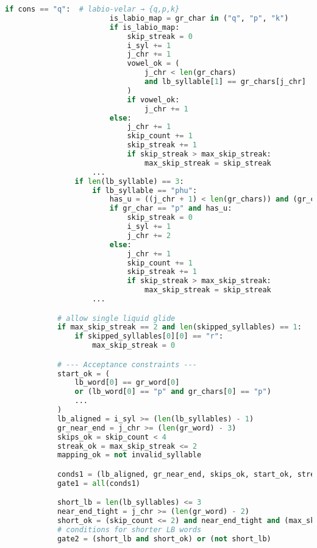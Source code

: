 \begin{lstlisting}[language=Python, caption=Brute-Force matching algorithm, breaklines=true, postbreak=\mbox{\hspace{50pt}\textcolor{red}{$\hookrightarrow$}\space}]
                    if cons == "q":  # labio-velar → {q,p,k}
                        is_labio_map = gr_char in ("q", "p", "k")
                        if is_labio_map:
                            skip_streak = 0
                            i_syl += 1
                            j_chr += 1
                            vowel_ok = (
                                j_chr < len(gr_chars)
                                and lb_syllable[1] == gr_chars[j_chr]
                            )
                            if vowel_ok:
                                j_chr += 1
                        else:
                            j_chr += 1
                            skip_count += 1
                            skip_streak += 1
                            if skip_streak > max_skip_streak:
                                max_skip_streak = skip_streak
                    ...
                if len(lb_syllable) == 3:
                    if lb_syllable == "phu":
                        has_u = ((j_chr + 1) < len(gr_chars)) and (gr_chars[j_chr + 1] == "u")
                        if gr_char == "p" and has_u:
                            skip_streak = 0
                            i_syl += 1
                            j_chr += 2
                        else:
                            j_chr += 1
                            skip_count += 1
                            skip_streak += 1
                            if skip_streak > max_skip_streak:
                                max_skip_streak = skip_streak
                    ...

            # allow single liquid glide
            if max_skip_streak == 2 and len(skipped_syllables) == 1:
                if skipped_syllables[0][0] == "r":
                    max_skip_streak = 0

            # --- Acceptance constraints ---
            start_ok = (
                lb_word[0] == gr_word[0]
                or (lb_word[0] == "p" and gr_chars[0] == "p")
                ...
            )
            lb_aligned = i_syl >= (len(lb_syllables) - 1)
            gr_near_end = j_chr >= (len(gr_word) - 3)
            skips_ok = skip_count < 4
            streak_ok = max_skip_streak <= 2
            mapping_ok = not invalid_syllable

            conds1 = (lb_aligned, gr_near_end, skips_ok, start_ok, streak_ok, mapping_ok)
            gate1 = all(conds1)

            short_lb = len(lb_syllables) <= 3
            near_end_tight = j_chr >= (len(gr_word) - 2)
            short_ok = (skip_count <= 2) and near_end_tight and (max_skip_streak < 2)
            # conditions for shorter LB words
            gate2 = (short_lb and short_ok) or (not short_lb)


\end{lstlisting}

